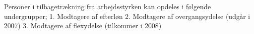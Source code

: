 
Personer i tilbagetrækning fra arbejdsstyrken kan opdeles i følgende undergrupper;
1. Modtagere af efterløn
2. Modtagere af overgangsydelse (udgår i 2007)
3. Modtagere af flexydelse (tilkommer i 2008)

